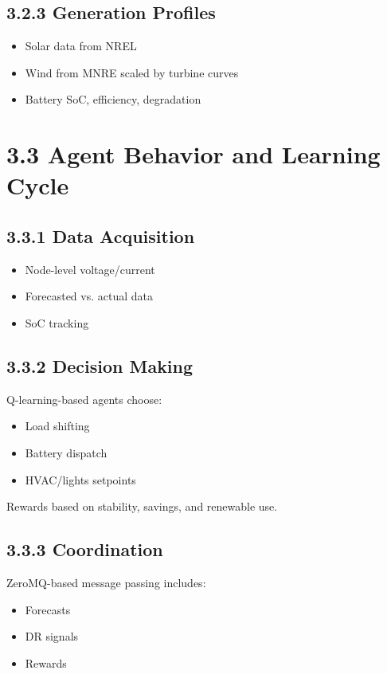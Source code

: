 \documentclass[12pt]{report}
\begin{document}
\subsection*{3.2.3 Generation Profiles}
\begin{itemize}
    \item Solar data from NREL
    \item Wind from MNRE scaled by turbine curves
    \item Battery SoC, efficiency, degradation
\end{itemize}

\section*{3.3 Agent Behavior and Learning Cycle}

\subsection*{3.3.1 Data Acquisition}
\begin{itemize}
    \item Node-level voltage/current
    \item Forecasted vs. actual data
    \item SoC tracking
\end{itemize}

\subsection*{3.3.2 Decision Making}
Q-learning-based agents choose:
\begin{itemize}
    \item Load shifting
    \item Battery dispatch
    \item HVAC/lights setpoints
\end{itemize}
Rewards based on stability, savings, and renewable use.

\subsection*{3.3.3 Coordination}
ZeroMQ-based message passing includes:
\begin{itemize}
    \item Forecasts
    \item DR signals
    \item Rewards
\end{itemize}
\end{document}
